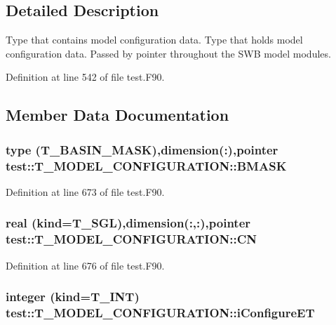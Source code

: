 \subsection{Detailed Description}
Type that contains model configuration data. Type that holds model configuration data. Passed by pointer throughout the SWB model modules. 

Definition at line 542 of file test.F90.



\subsection{Member Data Documentation}
\hypertarget{typetest_1_1_t___m_o_d_e_l___c_o_n_f_i_g_u_r_a_t_i_o_n_a0d55d3a1531a2bec8c7187266c9c521d}{
\subsubsection[{BMASK}]{\setlength{\rightskip}{0pt plus 5cm}type ({\bf T\_\-BASIN\_\-MASK}),dimension(:),pointer {\bf test::T\_\-MODEL\_\-CONFIGURATION::BMASK}}}
\label{typetest_1_1_t___m_o_d_e_l___c_o_n_f_i_g_u_r_a_t_i_o_n_a0d55d3a1531a2bec8c7187266c9c521d}


Definition at line 673 of file test.F90.

\hypertarget{typetest_1_1_t___m_o_d_e_l___c_o_n_f_i_g_u_r_a_t_i_o_n_aa5d2dbec2d279ed153946089830a651e}{
\subsubsection[{CN}]{\setlength{\rightskip}{0pt plus 5cm}real (kind={\bf T\_\-SGL}),dimension(:,:),pointer {\bf test::T\_\-MODEL\_\-CONFIGURATION::CN}}}
\label{typetest_1_1_t___m_o_d_e_l___c_o_n_f_i_g_u_r_a_t_i_o_n_aa5d2dbec2d279ed153946089830a651e}


Definition at line 676 of file test.F90.

\hypertarget{typetest_1_1_t___m_o_d_e_l___c_o_n_f_i_g_u_r_a_t_i_o_n_a7a892e494280b3d90bbb4d79e4cb28ec}{
\subsubsection[{iConfigureET}]{\setlength{\rightskip}{0pt plus 5cm}integer (kind={\bf T\_\-INT}) {\bf test::T\_\-MODEL\_\-CONFIGURATION::iConfigureET}}}
\label{typetest_1_1_t___m_o_d_e_l___c_o_n_f_i_g_u_r_a_t_i_o_n_a7a892e494280b3d90bbb4d79e4cb28ec}


